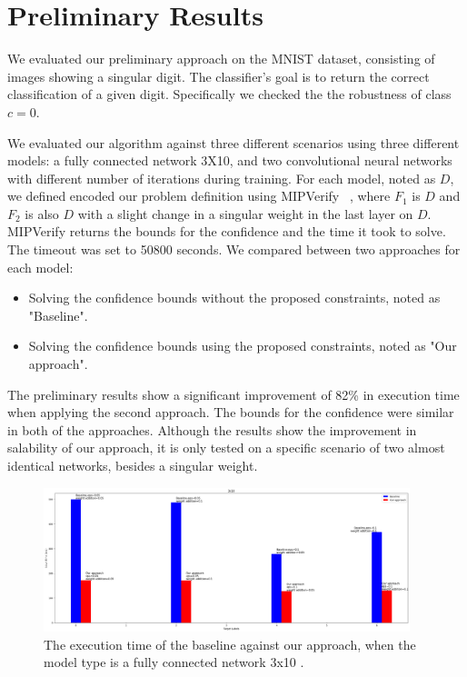 
\section{Preliminary Results}
We evaluated our preliminary approach on the MNIST dataset, consisting of images showing a singular digit.
The classifier's goal is to return the correct classification of a given digit. Specifically we checked the the robustness of class $c=0$.

We evaluated our algorithm against three different scenarios using three different models: a fully connected network 3X10, and two convolutional neural networks with different number of iterations during training. For each model, noted as $D$, we defined encoded our problem definition using MIPVerify ~\cite{MIPVERIFY}, where $F_1$ is $D$ and $F_2$ is also $D$ with a slight change in a singular weight in the last layer on $D$. MIPVerify returns the bounds for the confidence and the time it took to solve. The timeout was set to 50800 seconds. We compared between two approaches for each model:
\begin{itemize}
    \item Solving the confidence bounds without the proposed constraints, noted as "Baseline".
    \item Solving the confidence bounds using the proposed constraints, noted as "Our approach".
\end{itemize}
The preliminary results show a significant improvement of 82\% in execution time when applying the second approach.
The bounds for the confidence were similar in both of the approaches.
Although the results show the improvement in salability of our approach, it is only tested on a specific scenario of two almost identical networks, besides a singular weight.
\begin{figure}[ht]
  \centering
  \includegraphics[width=0.95\textwidth]{3x10.png}
  \caption{The execution time of the baseline against our approach, when the model type is a fully connected network 3x10 .}
  \label{fig:3_x_10}
\end{figure}

